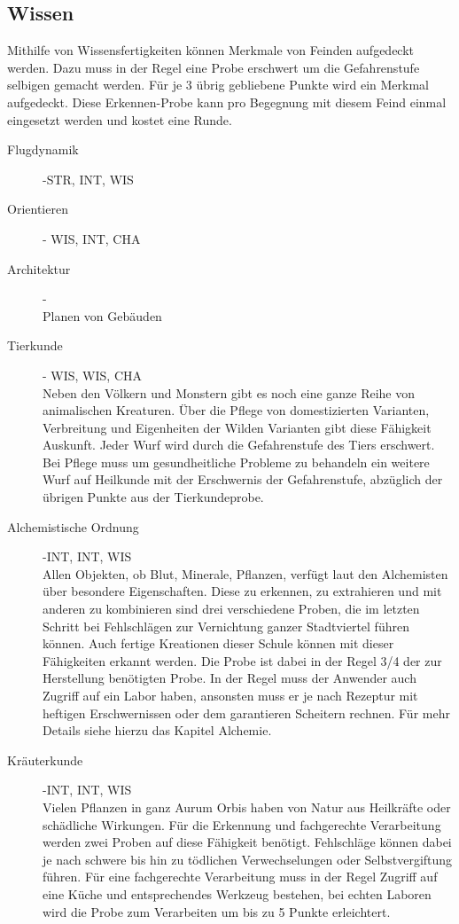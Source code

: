 \documentclass[a4paper,12pt,oneside]{book}
\begin{document}
\subsection{Wissen}
Mithilfe von Wissensfertigkeiten können Merkmale von Feinden aufgedeckt werden. Dazu muss in der Regel eine Probe erschwert um die Gefahrenstufe selbigen gemacht werden. Für je 3 übrig gebliebene Punkte wird ein Merkmal aufgedeckt. Diese Erkennen-Probe kann pro Begegnung mit diesem Feind einmal eingesetzt werden und kostet eine Runde.
\begin{description}
\item[Flugdynamik]-STR, INT, WIS
\item[Orientieren]- WIS, INT, CHA
\item[Architektur]-
\\Planen von Gebäuden
\item[Tierkunde]- WIS, WIS, CHA
\\Neben den Völkern und Monstern gibt es noch eine ganze Reihe von animalischen Kreaturen. Über die Pflege von domestizierten Varianten, Verbreitung und Eigenheiten der Wilden Varianten gibt diese Fähigkeit Auskunft. Jeder Wurf wird durch die Gefahrenstufe des Tiers erschwert. Bei Pflege muss um gesundheitliche Probleme zu behandeln ein weitere Wurf auf Heilkunde mit der Erschwernis der Gefahrenstufe, abzüglich der übrigen Punkte aus der Tierkundeprobe.
\item[Alchemistische Ordnung]-INT, INT, WIS
\\Allen Objekten, ob Blut, Minerale, Pflanzen, verfügt laut den Alchemisten über besondere Eigenschaften. Diese zu erkennen, zu extrahieren und mit anderen zu kombinieren sind drei verschiedene Proben, die im letzten Schritt bei Fehlschlägen zur Vernichtung ganzer Stadtviertel führen können. Auch fertige Kreationen dieser Schule können mit dieser Fähigkeiten erkannt werden. Die Probe ist dabei in der Regel 3/4 der zur Herstellung benötigten Probe. In der Regel muss der Anwender auch Zugriff auf ein Labor haben, ansonsten muss er je nach Rezeptur mit heftigen Erschwernissen oder dem garantieren Scheitern rechnen. Für mehr Details siehe hierzu das Kapitel Alchemie.
\item[Kräuterkunde]-INT, INT, WIS
\\Vielen Pflanzen in ganz Aurum Orbis haben von Natur aus Heilkräfte oder schädliche Wirkungen. Für die Erkennung und fachgerechte Verarbeitung werden zwei Proben auf diese Fähigkeit benötigt. Fehlschläge können dabei je nach schwere bis hin zu tödlichen Verwechselungen oder Selbstvergiftung führen. Für eine fachgerechte Verarbeitung muss in der Regel Zugriff auf eine Küche und entsprechendes Werkzeug bestehen, bei echten Laboren wird die Probe zum Verarbeiten um bis zu 5 Punkte erleichtert. 

\end{description}
\end{document}
